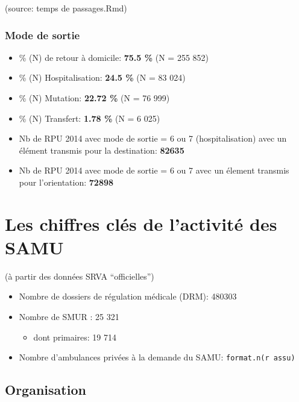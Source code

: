 \documentclass[]{article}
\begin{document}
(source: temps de passages.Rmd)

\subsubsection{Mode de sortie}\label{mode-de-sortie}

\begin{itemize}
\itemsep1pt\parskip0pt
\item
  \% (N) de retour à domicile: \textbf{75.5 \%} (N = 255 852)
\item
  \% (N) Hospitalisation: \textbf{24.5 \%} (N = 83 024)
\item
  \% (N) Mutation: \textbf{22.72 \%} (N = 76 999)
\item
  \% (N) Transfert: \textbf{1.78 \%} (N = 6 025)
\item
  Nb de RPU 2014 avec mode de sortie = 6 ou 7 (hospitalisation) avec un
  élément transmis pour la destination: \textbf{82635}
\item
  Nb de RPU 2014 avec mode de sortie = 6 ou 7 avec un élement transmis
  pour l'orientation: \textbf{72898}
\end{itemize}

\section{Les chiffres clés de l'activité des
SAMU}\label{les-chiffres-cles-de-lactivite-des-samu}

(à partir des données SRVA ``officielles'')

\begin{itemize}
\itemsep1pt\parskip0pt
\item
  Nombre de dossiers de régulation médicale (DRM): 480303
\item
  Nombre de SMUR : 25 321

  \begin{itemize}
  \itemsep1pt\parskip0pt
  \item
    dont primaires: 19 714
  \end{itemize}
\item
  Nombre d'ambulances privées à la demande du SAMU:
  \texttt{format.n(r assu)}
\end{itemize}

\subsection{Organisation}\label{organisation}
\end{document}
